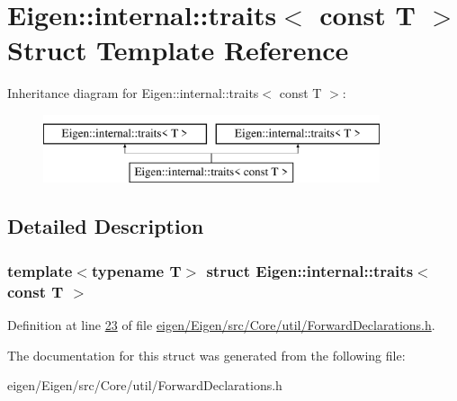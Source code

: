 \hypertarget{struct_eigen_1_1internal_1_1traits_3_01const_01_t_01_4}{}\section{Eigen\+:\+:internal\+:\+:traits$<$ const T $>$ Struct Template Reference}
\label{struct_eigen_1_1internal_1_1traits_3_01const_01_t_01_4}
Inheritance diagram for Eigen\+:\+:internal\+:\+:traits$<$ const T $>$\+:\begin{figure}[H]
\begin{center}
\leavevmode
\includegraphics[height=2.000000cm]{struct_eigen_1_1internal_1_1traits_3_01const_01_t_01_4}
\end{center}
\end{figure}


\subsection{Detailed Description}
\subsubsection*{template$<$typename T$>$\newline
struct Eigen\+::internal\+::traits$<$ const T $>$}



Definition at line \hyperlink{eigen_2_eigen_2src_2_core_2util_2_forward_declarations_8h_source_l00023}{23} of file \hyperlink{eigen_2_eigen_2src_2_core_2util_2_forward_declarations_8h_source}{eigen/\+Eigen/src/\+Core/util/\+Forward\+Declarations.\+h}.



The documentation for this struct was generated from the following file\+:\begin{DoxyCompactItemize}
\item 
eigen/\+Eigen/src/\+Core/util/\+Forward\+Declarations.\+h\end{DoxyCompactItemize}

